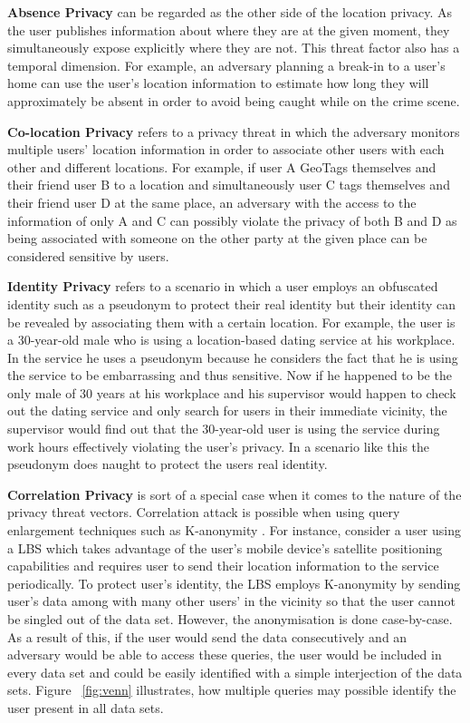 \documentclass[english]{tktltiki2}
\theoremstyle{definition}
\theoremstyle{remark}
\begin{document}
\textbf{Absence Privacy} can be regarded as the other side of the location privacy. As the user publishes information about where they are at the given moment, they simultaneously expose explicitly where they are not. This threat factor also has a temporal dimension. For example, an adversary planning a break-in to a user's home can use the user's location information to estimate how long they will approximately be absent in order to avoid being caught while on the crime scene.

\textbf{Co-location Privacy} refers to a privacy threat in which the adversary monitors multiple users' location information in order to associate other users with each other and different locations. For example, if user A GeoTags themselves and their friend user B to a location and simultaneously user C tags themselves and their friend user D at the same place, an adversary with the access to the information of only A and C can possibly violate the privacy of both B and D as being associated with someone on the other party at the given place can be considered sensitive by users.


\textbf{Identity Privacy} refers to a scenario in which a user employs an obfuscated identity such as a pseudonym to protect their real identity but their identity can be revealed by associating them with a certain location. For example, the user is a 30-year-old male who is using a location-based dating service at his workplace. In the service he uses a pseudonym because he considers the fact that he is using the service to be embarrassing and thus sensitive. Now if he happened to be the only male of 30 years at his workplace and his supervisor would happen to check out the dating service and only search for users in their immediate vicinity, the supervisor would find out that the 30-year-old user is using the service during work hours effectively violating the user's privacy. In a scenario like this the pseudonym does naught to protect the users real identity.

\textbf{Correlation Privacy} is sort of a special case when it comes to the nature of the privacy threat vectors. Correlation attack is possible when using query enlargement techniques such as K-anonymity \cite{Sweeney:2002:KAM:774544.774552}. For instance, consider a user using a LBS which takes advantage of the user's mobile device's satellite positioning capabilities and requires user to send their location information to the service periodically. To protect user's identity, the LBS employs K-anonymity by sending user's data among with many other users' in the vicinity so that the user cannot be singled out of the data set. However, the anonymisation is done case-by-case. As a result of this, if the user would send the data consecutively and an adversary would be able to access these queries, the user would be included in every data set and could be easily identified with a simple interjection of the data sets. Figure ~\ref{fig:venn} illustrates, how multiple queries may possible identify the user present in all data sets.
\end{document}
